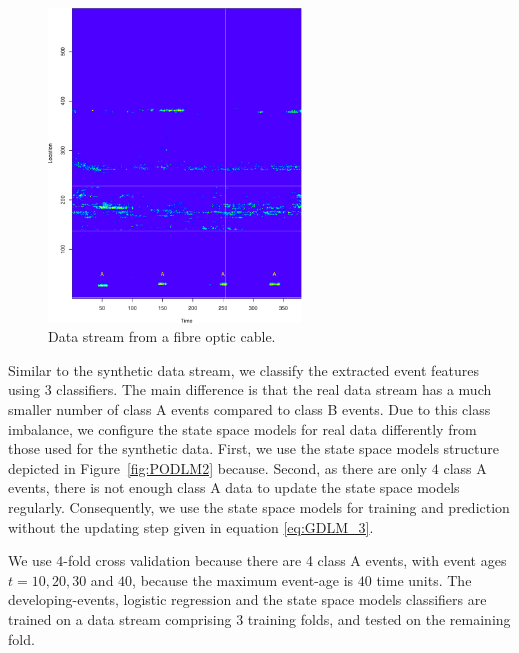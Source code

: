\documentclass[a4paper,11pt]{article}
\begin{document}
\begin{figure}[!b]
	\centering
	\includegraphics[width=0.6\textwidth]{./Graphics/Real_World_stream.pdf}
	\caption{Data stream from a fibre optic cable.}
	\label{fig:Real_World_Data_Stream}
\end{figure}

Similar to the synthetic data stream, we classify the extracted event features using 3 classifiers. The main difference is that the real data stream has a much smaller number of class A events compared to class B events. Due to this class imbalance, we configure the state space models for real data differently from those used for the synthetic data. First, we use the state space models structure depicted in Figure~\ref{fig:PODLM2} because. Second, as there are only $4$ class A events, there is not enough class A data to update the state space models regularly. Consequently, we use the state space models for training and prediction without the updating step given in equation \eqref{eq:GDLM_3}.

We use $4$-fold cross validation because there are 4 class A events, with event ages $t = 10, 20, 30$ and $40$, because the maximum event-age is $40$ time units. The developing-events, logistic regression and the state space models classifiers are trained on a data stream comprising 3 training folds, and tested on the remaining fold.
\end{document}

